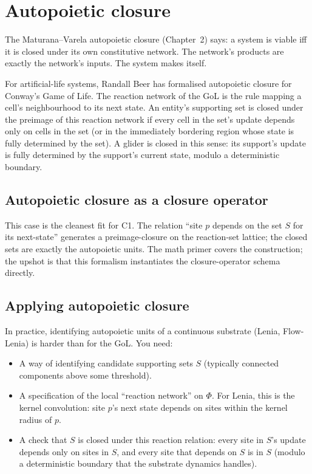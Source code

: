 \section{Autopoietic closure}

The Maturana--Varela autopoietic closure (Chapter~2) says: a system is
viable iff it is closed under its own constitutive network. The
network's products are exactly the network's inputs. The system makes
itself.

For artificial-life systems, Randall Beer has formalised autopoietic
closure for Conway's Game of Life. The reaction network of the GoL is
the rule mapping a cell's neighbourhood to its next state. An entity's
supporting set is closed under the preimage of this reaction network
if every cell in the set's update depends only on cells in the set
(or in the immediately bordering region whose state is fully determined
by the set). A glider is closed in this sense: its support's update is
fully determined by the support's current state, modulo a
deterministic boundary.

\subsection*{Autopoietic closure as a closure operator}

This case is the cleanest fit for C1. The relation ``site $p$ depends
on the set $S$ for its next-state'' generates a preimage-closure on
the reaction-set lattice; the closed sets are exactly the autopoietic
units. The math primer covers the construction; the upshot is that
this formalism instantiates the closure-operator schema directly.

\subsection*{Applying autopoietic closure}

In practice, identifying autopoietic units of a continuous substrate
(Lenia, Flow-Lenia) is harder than for the GoL. You need:

\begin{itemize}[leftmargin=1.5em,itemsep=2pt]
  \item A way of identifying candidate supporting sets $S$ (typically
    connected components above some threshold).
  \item A specification of the local ``reaction network'' on
    $\Phi$. For Lenia, this is the kernel convolution: site $p$'s next
    state depends on sites within the kernel radius of $p$.
  \item A check that $S$ is closed under this reaction relation: every
    site in $S$'s update depends only on sites in $S$, and every site
    that depends on $S$ is in $S$ (modulo a deterministic boundary
    that the substrate dynamics handles).
\end{itemize}

